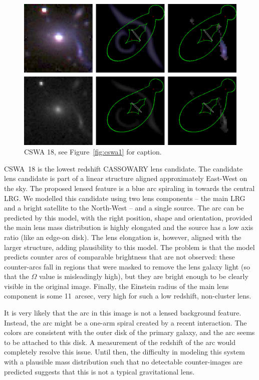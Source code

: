 \documentclass[iop]{emulateapj}
\begin{document}
\begin{figure}[!ht]
	\centering\includegraphics[width=\linewidth]{figs/18.eps}
	\caption{CSWA 18, see Figure~\ref{fig:cswa1} for caption.}
	\label{fig:cswa18}
\end{figure}

CSWA~18 is the lowest redshift CASSOWARY lens candidate. The candidate lens
candidate is part of a linear structure aligned approximately East-West on the
sky. The proposed lensed feature is a blue arc spiraling in towards the central
LRG. We modelled this candidate using two lens components --  the main LRG and a
bright satellite to the North-West -- and a single source. The arc can be
predicted by this model, with the right position, shape and orientation,
provided the main lens mass distribution is highly elongated and the source has
a low axis ratio (like an edge-on disk). The lens elongation is, however,
aligned with the larger structure, adding plausibility to this model.  The
problem is that the model predicts counter arcs of comparable brightness that
are not observed: these counter-arcs fall in regions that were masked to remove
the lens galaxy light (so that the $\Omega$ value is misleadingly high), but
they are bright enough to be clearly visible in the original image. Finally, the
Einstein radius of the main lens component is some 11~arcsec, very high for such
a low redshift, non-cluster lens.

It is very likely that the arc in this image is not a lensed background
feature.  Instead, the arc might be a one-arm spiral created by a recent
interaction. The colors are consistent with the outer disk of the primary
galaxy, and the arc seems to be attached to this disk. A measurement of the 
redshift of the arc would completely resolve this issue. Until then, the
difficulty in modeling this system with a plausible mass distribution such that
no detectable counter-images are predicted suggests that this is not a typical
gravitational lens.
\end{document}
